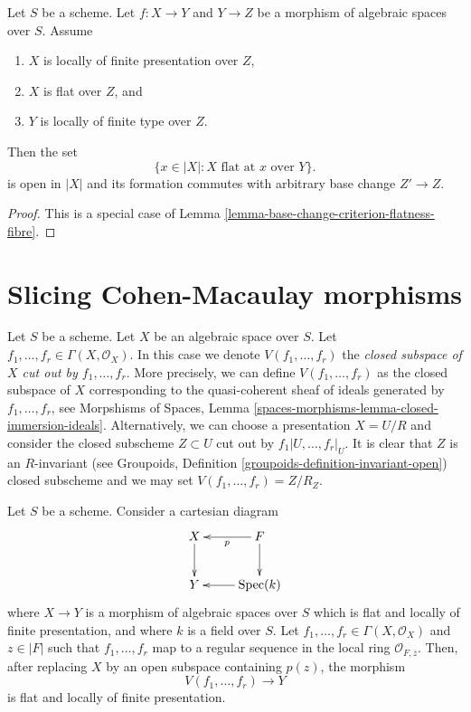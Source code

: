 \begin{lemma}
\label{lemma-base-change-flatness-fibres}
Let $S$ be a scheme.
Let $f : X \to Y$ and $Y \to Z$ be a morphism of algebraic spaces over $S$.
Assume
\begin{enumerate}
\item $X$ is locally of finite presentation over $Z$,
\item $X$ is flat over $Z$, and
\item $Y$ is locally of finite type over $Z$.
\end{enumerate}
Then the set
$$
\{x \in |X| : X\text{ flat at }x \text{ over }Y\}.
$$
is open in $|X|$ and its formation commutes with arbitrary base change
$Z' \to Z$.
\end{lemma}

\begin{proof}
This is a special case of
Lemma \ref{lemma-base-change-criterion-flatness-fibre}.
\end{proof}










\section{Slicing Cohen-Macaulay morphisms}
\label{section-slice}

\noindent
Let $S$ be a scheme. Let $X$ be an algebraic space over $S$.
Let $f_1, \ldots, f_r \in \Gamma(X, \mathcal{O}_X)$. In this case we
denote $V(f_1, \ldots, f_r)$ the {\it closed subspace of $X$ cut out by
$f_1, \ldots, f_r$}. More precisely, we can define $V(f_1, \ldots, f_r)$
as the closed subspace of $X$ corresponding to the quasi-coherent sheaf
of ideals generated by $f_1, \ldots, f_r$, see
Morpshisms of Spaces,
Lemma \ref{spaces-morphisms-lemma-closed-immersion-ideals}.
Alternatively, we can choose a presentation $X = U/R$ and consider the
closed subscheme $Z \subset U$ cut out by $f_1|U, \ldots, f_r|_U$.
It is clear that $Z$ is an $R$-invariant (see
Groupoids, Definition \ref{groupoids-definition-invariant-open})
closed subscheme and we may set $V(f_1, \ldots, f_r) = Z/R_Z$.

\begin{lemma}
\label{lemma-slice}
Let $S$ be a scheme. Consider a cartesian diagram
$$
\xymatrix{
X \ar[d] & F \ar[l]^p \ar[d] \\
Y & \text{Spec}(k) \ar[l]
}
$$
where $X \to Y$ is a morphism of algebraic spaces over $S$
which is flat and locally of finite presentation, and where
$k$ is a field over $S$. Let $f_1, \ldots, f_r \in \Gamma(X, \mathcal{O}_X)$
and $z \in |F|$ such that $f_1, \ldots, f_r$ map to a regular sequence
in the local ring $\mathcal{O}_{F, \overline{z}}$.
Then, after replacing $X$ by an open subspace containing $p(z)$, the morphism
$$
V(f_1, \ldots, f_r) \longrightarrow Y
$$
is flat and locally of finite presentation.
\end{lemma}

